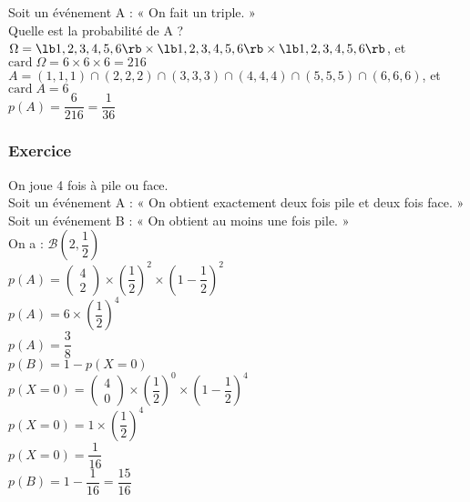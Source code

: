 Soit un événement A : « On fait un triple. » \\

Quelle est la probabilité de A ? \\

$\Omega = \lb 1,2,3,4,5,6 \rb \times \lb 1,2,3,4,5,6 \rb \times \lb 1,2,3,4,5,6 \rb $, et $\mathrm{card} \; \Omega = 6 \times 6 \times 6 = 216 $ \\

$ A = \left(1,1,1\right) \cap \left(2,2,2\right) \cap \left(3,3,3\right)\cap \left(4,4,4\right)\cap \left(5,5,5\right)\cap \left(6,6,6\right) $, et $\mathrm{card} \; A = 6 $ \\

$p\left(A\right) = \dfrac{6}{216} = \dfrac{1}{36} $ 

\subsubsection{Exercice }

On joue 4 fois à pile ou face. \\

Soit un événement A : « On obtient exactement deux fois pile et deux fois face. » \\

Soit un événement B : « On obtient au moins une fois pile. » \\

On a : $\mathcal{B} \left(2,\dfrac{1}{2}\right) $ \\

$p\left(A\right) = \left( \begin{array}{c} 4 \\ 2 \end{array} \right) \times \left(\dfrac{1}{2}\right)^2 \times \left( 1 - \dfrac{1}{2} \right)^2 $ \\

$ p\left(A\right) = 6 \times \left(\dfrac{1}{2} \right)^4 $ \\

$ p\left(A\right) = \dfrac{3}{8} $ \\

$ p\left(B\right) = 1 - p\left(X=0\right) $ \\

$p\left(X=0\right) = \left( \begin{array}{c} 4 \\ 0 \end{array} \right) \times \left(\dfrac{1}{2}\right)^0 \times \left(1 - \dfrac{1}{2} \right)^4 $ \\

$p\left(X=0\right) = 1 \times \left(\dfrac{1}{2}\right)^4 $ \\

$ p\left(X=0\right) = \dfrac{1}{16} $ \\

$ p\left(B\right) = 1 - \dfrac{1}{16} = \dfrac{15}{16} $ \\
 

